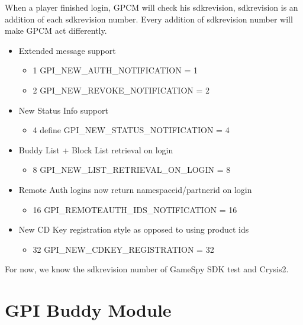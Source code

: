 \documentclass[oneside,titlepage,a4paper]{Definition/retrospy} %
\begin{document}
	When a player finished login, GPCM will check his sdkrevision, sdkrevision is an addition of each sdkrevision number. Every addition of sdkrevision number will make GPCM act differently.
\begin{mybox}
	\begin{itemize}
		\item Extended message support
		\begin{itemize}
			\item{1} GPI\_NEW\_AUTH\_NOTIFICATION = 1
			\item{2} GPI\_NEW\_REVOKE\_NOTIFICATION = 2
		\end{itemize}
		
		\item New Status Info support
		\begin{itemize}
			\item{4} define GPI\_NEW\_STATUS\_NOTIFICATION = 4
		\end{itemize}
		
		\item Buddy List + Block List retrieval on login
		\begin{itemize}
			\item{8} GPI\_NEW\_LIST\_RETRIEVAL\_ON\_LOGIN = 8
		\end{itemize}
	\item Remote Auth logins now return namespaceid/partnerid on login
	\begin{itemize}
		\item{16} GPI\_REMOTEAUTH\_IDS\_NOTIFICATION = 16
	\end{itemize}

	\item New CD Key registration style as opposed to using product ids
	\begin{itemize}
		\item{32}  GPI\_NEW\_CDKEY\_REGISTRATION = 32
	\end{itemize}

	\end{itemize}
\end{mybox}

For now, we know the sdkrevision number of GameSpy SDK test and Crysis2.


\section{GPI Buddy Module}
\end{document}

